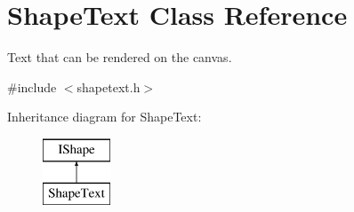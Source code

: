 \hypertarget{class_shape_text}{}\section{Shape\+Text Class Reference}
\label{class_shape_text}


Text that can be rendered on the canvas.  




{\ttfamily \#include $<$shapetext.\+h$>$}

Inheritance diagram for Shape\+Text\+:\begin{figure}[H]
\begin{center}
\leavevmode
\includegraphics[height=2.000000cm]{class_shape_text}
\end{center}
\end{figure}
